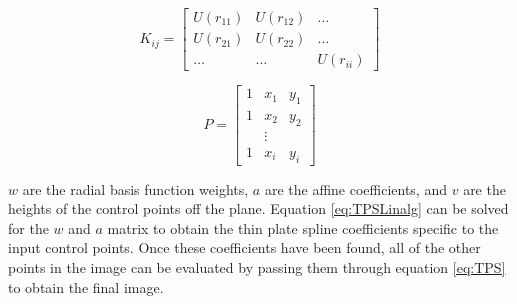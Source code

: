 \begin{center}
\begin{equation}
K_{ij} = 
\begin{bmatrix}
	U(r_{11})      & U(r_{12}) &  \dots \\
	U(r_{21})      & U(r_{22}) &  \dots \\
	\dots        & \dots   & U(r_{ii})
\end{bmatrix}
\end{equation}
\end{center}

\begin{center}
	\begin{equation}
	P = 
	\begin{bmatrix}
	1     & x_1 &  y_1 \\
	1     & x_2 &  y_2 \\
	      & \vdots &   \\
	1     & x_i  & y_i
	\end{bmatrix}
	\end{equation}
\end{center}
$w$ are the radial basis function weights, $a$ are the affine coefficients, and $v$ are the heights of the control points off the plane.  Equation \ref{eq:TPSLinalg} can be solved for the $w$ and $a$ matrix to obtain the thin plate spline coefficients specific to the input control points.  Once these coefficients have been found, all of the other points in the image can be evaluated by passing them through equation \ref{eq:TPS} to obtain the final image. 
